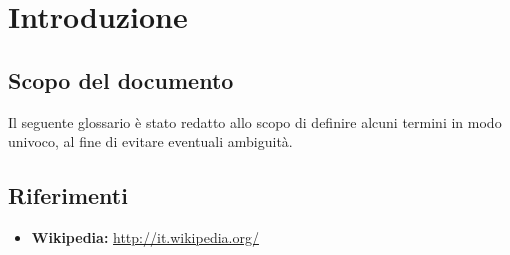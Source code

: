 \section{Introduzione}
\subsection{Scopo del documento}
Il seguente glossario è stato redatto allo scopo di definire alcuni termini in modo univoco, al fine di evitare eventuali ambiguità.

\subsection{Riferimenti}
\begin{itemize}
	\item \textbf{Wikipedia:} \href{http://it.wikipedia.org/}{http://it.wikipedia.org/}
\end{itemize}



